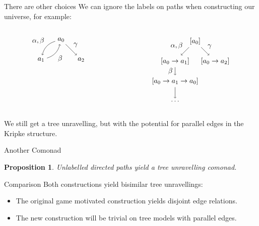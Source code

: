 \documentclass{beamer}
\newtheorem{proposition}{Proposition}
\begin{document}
\begin{frame}{There are other choices}
We can ignore the labels on paths when constructing our universe, for example:
\begin{columns}
\begin{column}{0.5\textwidth}
\begin{equation*}
    \begin{tikzpicture}
    \path node(a0) {$a_0$} +(-1,-1) node (a1) {$a_1$} +(1,-1) node(a2) {$a_2$};
    \path[->] 
    (a0) edge[bend right] node[midway, above left]{$\alpha, \beta$} (a1)
    (a1) edge[bend right] node[midway, below right]{$\beta$} (a0)
    (a0) edge node[midway, above right]{$\gamma$} (a2);
    \end{tikzpicture}
\end{equation*}
\end{column}
\begin{column}{0.5\textwidth}
\begin{equation*}
    \begin{tikzpicture}
    \path 
    node (a) {$[a_0]$} +(-1,-1) 
    node (b) {$[a_0 \rightarrow a_1]$} ++(1,-1)
    node (c) {$[a_0 \rightarrow a_2]$} (b) ++(0,-1)
    node (a') {$[a_0 \rightarrow a_1 \rightarrow a_0]$} ++(0,-1)
    node (dots) {$\ldots$};
    \path[->]
    (a) edge node[midway, above left]{$\alpha, \beta$} (b)
    (a) edge node[midway, above right]{$\gamma$} (c)
    (b) edge node[midway, left]{$\beta$} (a')
    (a') edge (dots);
    \end{tikzpicture}
\end{equation*}
\end{column}
\end{columns}
We still get a tree unravelling, but with the potential for parallel edges in the Kripke structure.
\end{frame}

\begin{frame}{Another Comonad}

    \begin{proposition}
    Unlabelled directed paths yield a tree unravelling comonad.
    \end{proposition}

    \begin{block}{Comparison}
    Both constructions yield bisimilar tree unravellings:
    \begin{itemize}
        \item The original game motivated construction yields disjoint edge relations.
        \item The new construction will be trivial on tree models with parallel edges.
    \end{itemize}
    \end{block}
\end{frame}
\end{document}
